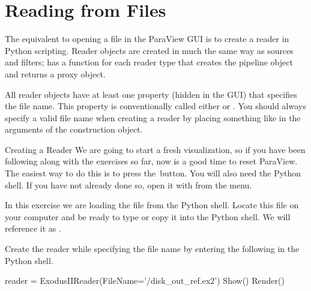 \section{Reading from Files}
\label{sec:ReadingFromFiles}

The equivalent to opening a file in the ParaView GUI is to create a reader
in Python scripting.  Reader objects are created in much the same way as
sources and filters;  has a function for each
reader type that creates the pipeline object and returns a proxy object.

All reader objects have at least one property (hidden in the GUI) that
specifies the file name.  This property is conventionally called either
 or .  You should always specify a valid
file name when creating a reader by placing something like
 in the arguments of the construction
object.

\begin{exercise}{Creating a Reader}
  \label{ex:CreatingAReader}%
  We are going to start a fresh visualization, so if you have been
  following along with the exercises so far, now is a good time to reset
  ParaView.  The easiest way to do this is to press the~\disconnect button.
  You will also need the Python shell.  If you have not already done so,
  open it with  \ra {} from the menu.

  In this exercise we are loading the  file from
  the Python shell.  Locate this file on your computer and be ready to type
  or copy it into the Python shell.  We will reference it as
  .

  Create the reader while specifying the file name by entering the following
  in the Python shell.

  \begin{pythonpluscommands}
reader = ExodusIIReader(FileName='/disk_out_ref.ex2')
Show()
Render()
  \end{pythonpluscommands}
\end{exercise}


